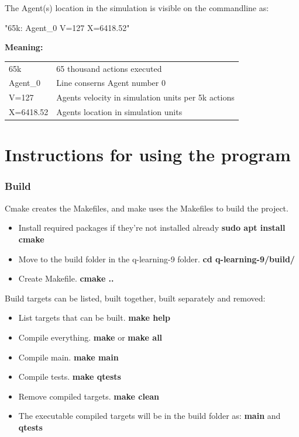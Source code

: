 \documentclass{article}
\begin{document}
The Agent(s) location in the simulation is visible on the commandline as:

"65k: Agent\_0 V=127 X=6418.52"

\textbf{Meaning:}

\begin{tabular}{ll}
65k                     & 65 thousand actions executed \\
Agent\_0                & Line conserns Agent number 0 \\
V=127                   & Agents velocity in simulation units per 5k actions\\
X=6418.52               & Agents location in simulation units\\
\end{tabular}


\section{Instructions for using the program}

\subsubsection{Build}
Cmake creates the Makefiles, and make uses the Makefiles to build the project.

\begin{itemize}
  \item Install required packages if they're not installed already
  \textbf{sudo apt install cmake}

  \item Move to the build folder in the q-learning-9 folder.
  \textbf{cd q-learning-9/build/}

  \item Create Makefile.
  \textbf{cmake ..}
\end{itemize}

Build targets can be listed, built together, built separately and removed:

\begin{itemize}
  \item List targets that can be built. \textbf{make help}

 \item Compile everything. \textbf{make} or \textbf{make all}

 \item Compile main. \textbf{make main}

 \item Compile tests. \textbf{make qtests}

 \item Remove compiled targets. \textbf{make clean}

 \item The executable compiled targets will be in the build folder as:
  \textbf{main} and \textbf{qtests}
\end{itemize}
\end{document}

